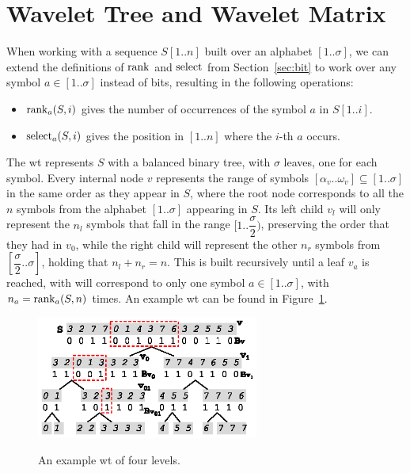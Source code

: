 \documentclass[a4paper,10pt,twoside]{book}
\begin{document}
	\section{Wavelet Tree and Wavelet Matrix}
	\label{sec:wt}
	When working with a sequence $S[1..n]$ built over an alphabet $[1..\sigma]$, we can extend the definitions of $\operatorname{rank}$ and $\operatorname{select}$ from Section~\ref{sec:bit} to work over any symbol $a \in [1..\sigma]$ instead of bits, resulting in the following operations:
	
	\begin{itemize}
	    \item $\operatorname{rank}_a(S,i)$ gives the number of occurrences of the symbol $a$ in $S[1..i]$.
	    \item $\operatorname{select}_a(S,i)$ gives the position in $[1..n]$ where the $i$-th $a$ occurs.
	\end{itemize}
	
    The \acrfull{wt} \cite{WT03} represents $S$ with a balanced binary tree, with $\sigma$ leaves, one for each symbol. Every internal node $v$ represents the range of symbols $[\alpha_v..\omega_v] \subseteq [1..\sigma]$ in the same order as they appear in $S$, where the root node corresponds to all the $n$ symbols from the alphabet $[1..\sigma]$ appearing in $S$. Its left child $v_l$ will only represent the $n_l$ symbols that fall in the range $[1..\dfrac{\sigma}{2})$, preserving the order that they had in $v_0$, while the right child will represent the other $n_r$ symbols from $[\dfrac{\sigma}{2}..\sigma]$, holding that $n_l+n_r=n$. This is built recursively until a leaf $v_a$ is reached, with will correspond to only one symbol $a \in [1..\sigma]$, with $n_a = \operatorname{rank}_a(S,n)$ times. An example \gls{wt} can be found in Figure~\ref{fig:wt}.
    
    \begin{figure}[ht]
		\begin{center}
			{\includegraphics[width=0.65\textwidth]{figures/wt1.eps}}
		\end{center}
		\caption{An example \acrlong{wt} of four levels.}
		\label{fig:wt}
	\end{figure}
    
\end{document}
